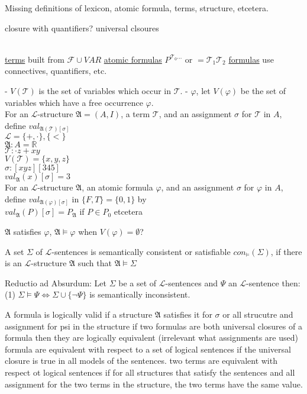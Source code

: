 \documentclass[11pt]{amsart}
\begin{document}
    Missing definitions of lexicon, atomic formula, terms, structure, etcetera.

    closure with quantifiers? universal clsoures
    \\ \\
    \newcommand{\FF}{\mathcal{F}}
    \newcommand{\LL}{\mathcal{L}}
    \newcommand{\TT}{\mathcal{T}}

    \underline{terms} built from $\FF \cup VAR$
    \underline{atomic formulas} $P^{\TT_0 ...}$ or $= \TT_1 \TT_2$
    \underline{formulas} use connectives, quantifiers, etc.


    - $V(\TT)$ is the set of variables which occur in $\TT$.
    - $\varphi$, let $V(\varphi)$ be the set of variables which have a free occurrence $\varphi$.
    \\
    For an $\LL$-structure $\mathfrak{A}=(A,I)$, a term $\TT$, and an assignment $\sigma$ for $\TT$ in $A$, define $val_{\mathfrak{A}(\TT)[\sigma]}$
    \\
    $\LL = \{+,\cdot\},\{<\}$ \\
    $\mathfrak{A}: A = \mathbb{R}$ \\
    $\TT: \cdot z + x y$ \\
    $V(\TT) = \{x,y,z\}$ \\
    $\sigma: [x y z][3 4 5]$ \\
    $val_\mathfrak{A}(x)[\sigma]=3$ \\

    For an $\LL$-structure $\mathfrak{A}$, an atomic formula $\varphi$, and an assignment $\sigma$ for $\varphi$ in $A$, define $val_{\mathfrak{A}(\varphi)[\sigma]}$ in $\{F,T\}=\{0,1\}$ by \\
    $val_\mathfrak{A}(P)[\sigma] = P_\mathfrak{A}$ if $P \in P_0$
    etcetera

    $\mathfrak{A}$ satisfies $\varphi$, $\mathfrak{A} \models \varphi$ when $V(\varphi) = \emptyset$?

    A set $\Sigma$ of $\LL$-sentences is semantically consistent or satisfiable $con_{\models}(\Sigma)$, if there is an $\LL$-structure $\mathfrak{A}$ such that $\mathfrak{A} \models \Sigma$

    Reductio ad Absurdum: Let $\Sigma$ be a set of $\LL$-sentences and $\Psi$ an $\LL$-sentence then:
    (1) $\Sigma \models \Psi \iff \Sigma \cup \{\neg \Psi\}$ is semantically inconsistent.

    A formula is logically valid if a structure $\mathfrak{A}$ satisfies it for $\sigma$ or all strucutre and assignment for psi in the structure
    if two formulas are both universal closures of a formula then they are logically equivalent (irrelevant what assignments are used)
    formula are equivalent with respect to a set of logical sentences if the universal closure is true in all models of the sentences.
    two terms are equivalent with respect ot logical sentences if for all structures that satisfy the sentences and all assignment for the two terms in the structure, the two terms have the same value.
\end{document}
